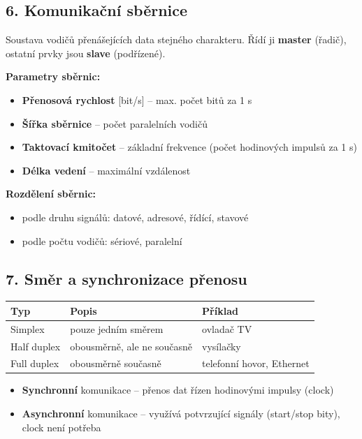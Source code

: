\documentclass[a4paper,10pt]{article}
\begin{document}
\begin{vysvetlenibox}
\subsection*{6. Komunikační sběrnice}

Soustava vodičů přenášejících data stejného charakteru. Řídí ji \textbf{master} (řadič), ostatní prvky jsou \textbf{slave} (podřízené).

\textbf{Parametry sběrnic:}
\begin{itemize}
  \item \textbf{Přenosová rychlost} [bit/s] – max. počet bitů za 1 s
  \item \textbf{Šířka sběrnice} – počet paralelních vodičů
  \item \textbf{Taktovací kmitočet} – základní frekvence (počet hodinových impulsů za 1 s)
  \item \textbf{Délka vedení} – maximální vzdálenost
\end{itemize}

\textbf{Rozdělení sběrnic:}
\begin{itemize}
  \item podle druhu signálů: datové, adresové, řídící, stavové
  \item podle počtu vodičů: sériové, paralelní
\end{itemize}

\subsection*{7. Směr a synchronizace přenosu}

\begin{center}
\begin{tabularx}{0.95\linewidth}{@{} l X X @{}}
\toprule
\textbf{Typ} & \textbf{Popis} & \textbf{Příklad} \\
\midrule
Simplex & pouze jedním směrem & ovladač TV \\
Half duplex & obousměrně, ale ne současně & vysílačky \\
Full duplex & obousměrně současně & telefonní hovor, Ethernet \\
\bottomrule
\end{tabularx}
\end{center}

\begin{itemize}
  \item \textbf{Synchronní} komunikace – přenos dat řízen hodinovými impulsy (clock)
  \item \textbf{Asynchronní} komunikace – využívá potvrzující signály (start/stop bity), clock není potřeba
\end{itemize}


\end{vysvetlenibox}
\end{document}
